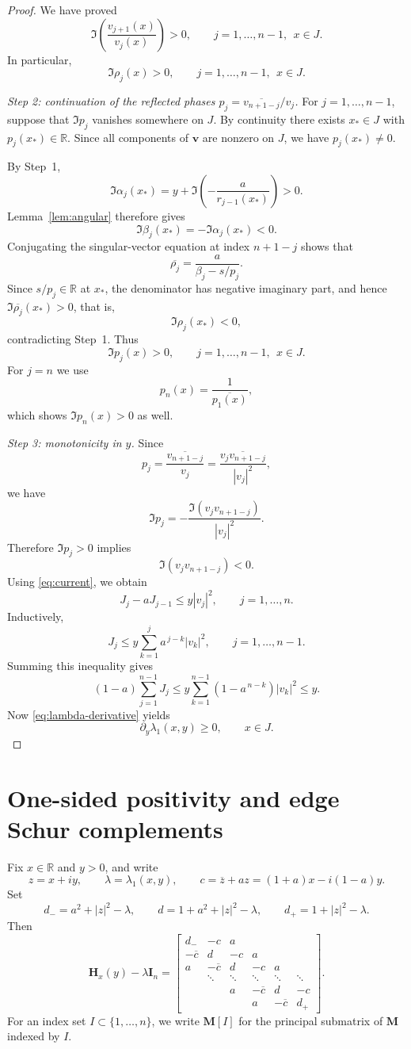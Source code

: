 \documentclass[11pt]{article}
\numberwithin{equation}{section}
\begin{document}
\begin{proof}
We have proved
\[
\Im\!\left(\frac{v_{j+1}(x)}{v_j(x)}\right)>0,
\qquad
j=1,\dots,n-1,\ \ x\in J.
\]
In particular,
\[
\Im \rho_j(x)>0,
\qquad
j=1,\dots,n-1,\ \ x\in J.
\]

\medskip
\noindent
\emph{Step 2: continuation of the reflected phases
$p_j=\overline{v_{n+1-j}}/v_j$.}
For $j=1,\dots,n-1$, suppose that $\Im p_j$ vanishes somewhere on $J$.
By continuity there exists $x_*\in J$ with $p_j(x_*)\in\mathbb{R}$.  Since all
components of $\bm v$ are nonzero on $J$, we have $p_j(x_*)\neq0$.

By Step~1,
\[
\Im\alpha_j(x_*)=
y+\Im\!\left(-\frac{a}{r_{j-1}(x_*)}\right)>0.
\]
Lemma~\ref{lem:angular} therefore gives
\[
\Im\beta_j(x_*)=-\Im\alpha_j(x_*)<0.
\]
Conjugating the singular-vector equation at index $n+1-j$ shows that
\[
\overline{\rho_j}
=
\frac{a}{\beta_j-s/p_j}.
\]
Since $s/p_j\in\mathbb{R}$ at $x_*$, the denominator has negative imaginary part,
and hence $\Im\overline{\rho_j}(x_*)>0$, that is,
\[
\Im\rho_j(x_*)<0,
\]
contradicting Step~1.  Thus
\[
\Im p_j(x)>0,
\qquad
j=1,\dots,n-1,\ \ x\in J.
\]
For $j=n$ we use
\[
p_n(x)=\frac{1}{\overline{p_1(x)}},
\]
which shows $\Im p_n(x)>0$ as well.

\medskip
\noindent
\emph{Step 3: monotonicity in $y$.}
Since
\[
p_j
=
\frac{\overline{v_{n+1-j}}}{v_j}
=
\frac{\overline{v_jv_{n+1-j}}}{|v_j|^2},
\]
we have
\[
\Im p_j
=
-\frac{\Im(v_jv_{n+1-j})}{|v_j|^2}.
\]
Therefore $\Im p_j>0$ implies
\[
\Im(v_jv_{n+1-j})<0.
\]
Using \eqref{eq:current}, we obtain
\[
J_j-aJ_{j-1}\le y|v_j|^2,
\qquad
j=1,\dots,n.
\]
Inductively,
\[
J_j
\le
y\sum_{k=1}^j a^{\,j-k}|v_k|^2,
\qquad
j=1,\dots,n-1.
\]
Summing this inequality gives
\[
(1-a)\sum_{j=1}^{n-1}J_j
\le
y\sum_{k=1}^{n-1}(1-a^{\,n-k})|v_k|^2
\le y.
\]
Now \eqref{eq:lambda-derivative} yields
\[
\partial_y\lambda_1(x,y)\ge0,
\qquad x\in J.
\]
\end{proof}

\section{One-sided positivity and edge Schur complements}\label{sec:schur}

Fix $x\in\mathbb{R}$ and $y>0$, and write
\[
z=x+iy,
\qquad
\lambda=\lambda_1(x,y),
\qquad
c=\overline z+az=(1+a)x-i(1-a)y.
\]
Set
\[
d_-=a^2+|z|^2-\lambda,
\qquad
d=1+a^2+|z|^2-\lambda,
\qquad
d_+=1+|z|^2-\lambda.
\]
Then
\[
\mathbf H_x(y)-\lambda\mathbf I_n
=
\begin{bmatrix}
d_- & -c & a \\
-\overline c & d & -c & a \\
a & -\overline c & d & -c & a \\
& \ddots & \ddots & \ddots & \ddots & \ddots \\
&& a & -\overline c & d & -c \\
&&& a & -\overline c & d_+
\end{bmatrix}.
\]
For an index set $I\subset\{1,\dots,n\}$, we write $\mathbf M[I]$ for the
principal submatrix of $\mathbf M$ indexed by $I$.
\end{document}

